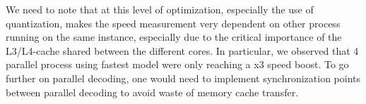 \documentclass[11pt,a4paper]{article}
\begin{document}
We need to note that at this level of optimization, especially the use of quantization, makes the speed measurement very dependent on other process running on the same instance, especially due to the critical importance of the L3/L4-cache shared between the different cores. In particular, we observed that 4 parallel process using fastest model were only reaching a x3 speed boost. To go further on parallel decoding, one would need to implement synchronization points between parallel decoding to avoid waste of memory cache transfer.
 
%

%
%


\end{document}
